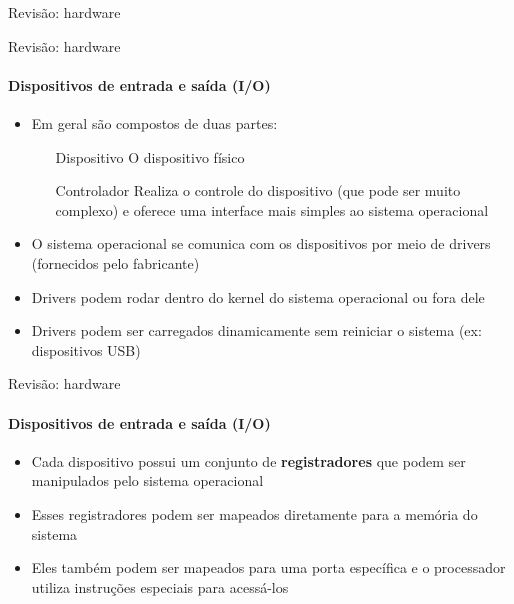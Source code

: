 \documentclass{beamer}
\begin{document}
\begin{frame}{Revisão: hardware}
\end{frame}
\begin{frame}{Revisão: hardware}
	\framesubtitle{Dispositivos de entrada e saída (I/O)}
	\begin{itemize}
		\item Em geral são compostos de duas partes:
		\begin{itemize}
			\item[Dispositivo] O dispositivo físico
			\item[Controlador] Realiza o controle do dispositivo (que pode ser muito complexo) e oferece uma interface mais simples ao sistema operacional
		\end{itemize}
		\item O sistema operacional se comunica com os dispositivos por meio de \alert{drivers} (fornecidos pelo fabricante)
		\item Drivers podem rodar dentro do kernel do sistema operacional ou fora dele
		\item Drivers podem ser carregados dinamicamente sem reiniciar o sistema (ex: dispositivos USB)
	\end{itemize}
\end{frame}
\begin{frame}{Revisão: hardware}
	\framesubtitle{Dispositivos de entrada e saída (I/O)}
	\begin{itemize}
		\item Cada dispositivo possui um conjunto de \textbf{registradores} que podem ser manipulados pelo sistema operacional
		\item Esses registradores podem ser mapeados diretamente para a memória do sistema
		\item Eles também podem ser mapeados para uma porta específica e o processador utiliza instruções especiais para acessá-los
	\end{itemize}
\end{frame}
\end{document}
